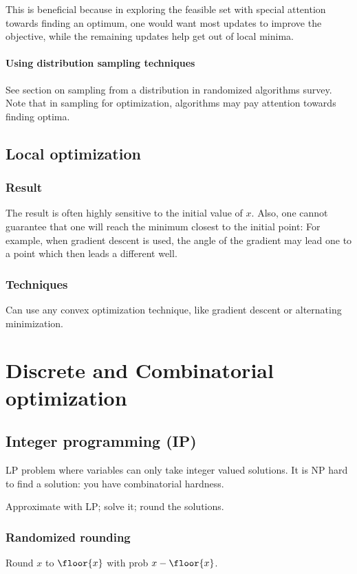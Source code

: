 \documentclass[oneside, article]{memoir}
\begin{document}
This is beneficial because in exploring the feasible set with special attention towards finding an optimum, one would want most updates to improve the objective, while the remaining updates help get out of local minima.

\subsection{Using distribution sampling techniques}
See section on sampling from a distribution in randomized algorithms survey. Note that in sampling for optimization, algorithms may pay attention towards finding optima.

\chapter{Local optimization}
\section{Result}
The result is often highly sensitive to the initial value of $x$. Also, one cannot guarantee that one will reach the minimum closest to the initial point: For example, when gradient descent is used, the angle of the gradient may lead one to a point which then leads a different well.

\section{Techniques}
Can use any convex optimization technique, like gradient descent or alternating minimization.

\part{Discrete and Combinatorial optimization}
\chapter{Integer programming (IP)}
LP problem where variables can only take integer valued solutions. It is NP hard to find a solution: you have combinatorial hardness.

Approximate with LP; solve it; round the solutions. \tbc

\section{Randomized rounding}
Round $x$ to $\floor{x}$ with prob $x - \floor{x}$.
\end{document}
